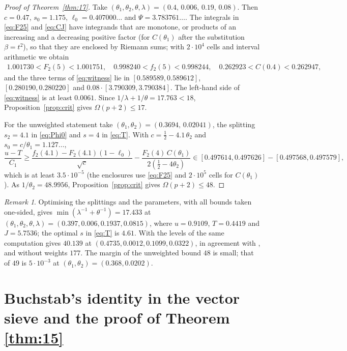 \documentclass[11pt,a4paper]{amsart}
\theoremstyle{remark}
\newtheorem{remark}[theorem]{Remark}
\numberwithin{equation}{section}
\begin{document}
\begin{proof}[Proof of Theorem~\ref{thm:17}]
Take $(\theta_1,\theta_2,\theta,\lambda)=(0.4,\,0.006,\,0.19,\,0.08)$. Then $c=0.47$, $s_0=1.175$,
$\ell_0=0.407000\ldots$ and $\Psi=3.783761\ldots$. The integrals in \eqref{eq:F25} and \eqref{eq:CJ} have
integrands that are monotone, or products of an increasing and a decreasing positive factor (for $C(\theta_1)$
after the substitution $\beta=t^2$), so that they are enclosed by Riemann sums; with $2\cdot10^4$ cells and
interval arithmetic we obtain
\begin{gather*}
1.001730<F_2(5)<1.001751,\quad 0.998240<f_2(5)<0.998244,\quad 0.262923<C(0.4)<0.262947,
\end{gather*}
and the three terms of \eqref{eq:witness} lie in $[0.589589,0.589612]$, $[0.280190,0.280220]$ and
$0.08\cdot[3.790309,3.790384]$. The left-hand side of \eqref{eq:witness} is at least $0.0061$. Since
$1/\lambda+1/\theta=17.763<18$, Proposition~\ref{prop:crit} gives $\Omega(p+2)\le17$.

For the unweighted statement take $(\theta_1,\theta_2)=(0.3694,\,0.02041)$, the splitting $s_2=4.1$ in
\eqref{eq:Phi0} and $s=4$ in \eqref{eq:T}. With $c=\frac12-4.1\,\theta_2$ and $s_0=c/\theta_1=1.127\ldots$,
\[
\frac{u-T}{C_1}\ge\frac{f_2(4.1)-F_2(4.1)(1-\ell_0)}{\sqrt c}-\frac{F_2(4)\,C(\theta_1)}{2(\frac12-4\theta_2)}
\in[0.497614,0.497626]-[0.497568,0.497579],
\]
which is at least $3.5\cdot10^{-5}$ (the enclosures use \eqref{eq:F25} and $2\cdot10^5$ cells for $C(\theta_1)$).
As $1/\theta_2=48.9956$, Proposition~\ref{prop:crit} gives $\Omega(p+2)\le48$.
\end{proof}

\begin{remark}\label{rem:opt17}
Optimising the splittings and the parameters, with all bounds taken one-sided, gives
$\min(\lambda^{-1}+\theta^{-1})=17.433$ at $(\theta_1,\theta_2,\theta,\lambda)=(0.397,0.006,0.1937,0.0815)$, where
$u=0.9109$, $T=0.4419$ and $J=5.7536$; the optimal $s$ in \eqref{eq:T} is $4.61$. With the levels of
\cite{NX,NXerr} the same computation gives $40.139$ at $(0.4735,0.0012,0.1099,0.0322)$, in agreement with
\cite{NXerr}, and without weights $177$. The margin of the unweighted bound $48$ is small; that of $49$ is
$5\cdot10^{-3}$ at $(\theta_1,\theta_2)=(0.368,0.0202)$.
\end{remark}

\section{Buchstab's identity in the vector sieve and the proof of Theorem \texorpdfstring{\ref{thm:15}}{1.2}}\label{sec:buchstab}
\end{document}
